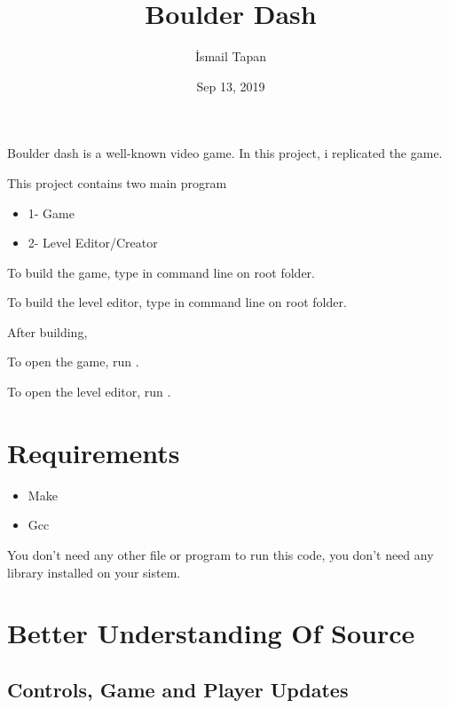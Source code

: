 \documentclass[letterpaper,10pt,english]{sphinxmanual}
\title{Boulder Dash}
\date{Sep 13, 2019}
\author{İsmail Tapan}
\begin{document}
\pagestyle{empty}
\sphinxmaketitle
\pagestyle{plain}
\sphinxtableofcontents
\pagestyle{normal}
\label{\detokenize{index::doc}}


Boulder dash is a well-known video game. In this project, i replicated the game.

This project contains two main program
\begin{itemize}
\item {} 
1- Game

\item {} 
2- Level Editor/Creator

\end{itemize}

\begin{DUlineblock}{0em}
\item[] To build the game, type  in command line on root folder.
\item[] To build the level editor, type  in command line on root folder.
\item[] 
\item[] After building,
\item[] To open the game, run .
\item[] To open the level editor, run .
\end{DUlineblock}


\chapter{Requirements}
\label{\detokenize{index:requirements}}\begin{itemize}
\item {} 
Make

\item {} 
Gcc

\end{itemize}

You don’t need any other file or program to run this code, you don’t need any library installed on your sistem.


\chapter{Better Understanding Of Source}
\label{\detokenize{index:better-understanding-of-source}}

\section{Controls, Game and Player Updates}
\label{\detokenize{player:controls-game-and-player-updates}}\label{\detokenize{player::doc}}
\end{document}
